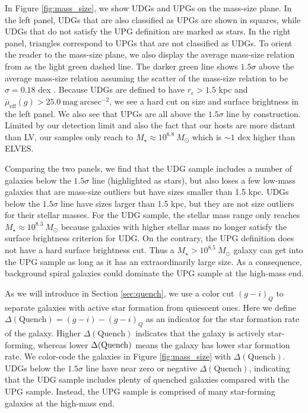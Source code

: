 \documentclass[twocolumn,astrosymb,twocolappendix]{aastex631}
\newcommand{\sbunit}{\mathrm{mag\ arcsec}^{-2}}
\newcommand{\sbeff}{\overline{\mu}_{\mathrm{eff}}(g)}
\begin{document}
\begin{CJK*}{UTF8}{gbsn}
In Figure \ref{fig:mass_size}, we show UDGs and UPGs on the mass-size plane. In the left panel, UDGs that are also classified as UPGs are shown in squares, while UDGs that do not satisfy the UPG definition are marked as stars. In the right panel, triangles correspond to UPGs that are not classified as UDGs. To orient the reader to the mass-size plane, we also display the average mass-size relation from \citep{ELVES-I} as the light green dashed line. The darker green line shows $1.5\sigma$ above the average mass-size relation assuming the scatter of the mass-size relation to be $\sigma=0.18$ dex \citep{ELVES-I}. Because UDGs are defined to have $r_e > 1.5$ kpc and $\sbeff > 25.0\ \sbunit$, we see a hard cut on size and surface brightness in the left panel. We also see that UPGs are all above the $1.5\sigma$ line by construction. Limited by our detection limit and also the fact that our hosts are more distant than LV, our samples only reach to $M_\star \approx 10^{6.8}\ M_\odot$ which is $\sim 1$ dex higher than ELVES. 

Comparing the two panels, we find that the UDG sample includes a number of galaxies below the $1.5\sigma$ line (highlighted as stars), but also loses a few low-mass galaxies that are mass-size outliers but have sizes smaller than 1.5 kpc. UDGs below the $1.5\sigma$ line have sizes larger than 1.5 kpc, but they are not size outliers for their stellar masses. For the UDG sample, the stellar mass range only reaches $M_\star\approx 10^{8.3}\ M_\odot$ because galaxies with higher stellar mass no longer satisfy the surface brightness criterion for UDG. On the contrary, the UPG definition does not have a hard surface brightness cut. Thus a $M_\star > 10^{8.5}\ M_\odot$ galaxy can get into the UPG sample as long as it has an extraordinarily large size. As a consequence, background spiral galaxies could dominate the UPG sample at the high-mass end.


As we will introduce in Section \ref{sec:quench}, we use a color cut $(g-i)_{Q}$ to separate galaxies with active star formation from quiescent ones. Here we define $\Delta(\mathrm{Quench}) = (g-i) - (g-i)_{Q}$ as an indicator for the star formation rate of the galaxy. Higher $\Delta(\mathrm{Quench})$ indicates that the galaxy is actively star-forming, whereas lower $\Delta(\rm Quench)$ means the galaxy has lower star formation rate. We color-code the galaxies in Figure \ref{fig:mass_size} with $\Delta(\mathrm{Quench})$. UDGs below the $1.5\sigma$ line have near zero or negative $\Delta(\mathrm{Quench})$, indicating that the UDG sample includes plenty of quenched galaxies compared with the UPG sample. Instead, the UPG sample is comprised of many star-forming galaxies at the high-mass end. 


\end{CJK*}
\end{document}
